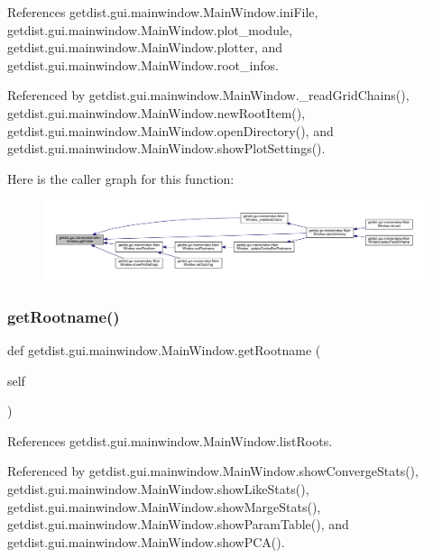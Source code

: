 References getdist.\+gui.\+mainwindow.\+Main\+Window.\+ini\+File, getdist.\+gui.\+mainwindow.\+Main\+Window.\+plot\+\_\+module, getdist.\+gui.\+mainwindow.\+Main\+Window.\+plotter, and getdist.\+gui.\+mainwindow.\+Main\+Window.\+root\+\_\+infos.



Referenced by getdist.\+gui.\+mainwindow.\+Main\+Window.\+\_\+read\+Grid\+Chains(), getdist.\+gui.\+mainwindow.\+Main\+Window.\+new\+Root\+Item(), getdist.\+gui.\+mainwindow.\+Main\+Window.\+open\+Directory(), and getdist.\+gui.\+mainwindow.\+Main\+Window.\+show\+Plot\+Settings().

Here is the caller graph for this function\+:
\nopagebreak
\begin{figure}[H]
\begin{center}
\leavevmode
\includegraphics[width=350pt]{classgetdist_1_1gui_1_1mainwindow_1_1MainWindow_a385cc81f23347ee51f9ee4454a676074_icgraph}
\end{center}
\end{figure}
\mbox{\label{classgetdist_1_1gui_1_1mainwindow_1_1MainWindow_addbd3bf89b07a5176f3daad52ada42c9}} 
\subsubsection{\texorpdfstring{get\+Rootname()}{getRootname()}}
{\footnotesize\ttfamily def getdist.\+gui.\+mainwindow.\+Main\+Window.\+get\+Rootname (\begin{DoxyParamCaption}\item[{}]{self }\end{DoxyParamCaption})}



References getdist.\+gui.\+mainwindow.\+Main\+Window.\+list\+Roots.



Referenced by getdist.\+gui.\+mainwindow.\+Main\+Window.\+show\+Converge\+Stats(), getdist.\+gui.\+mainwindow.\+Main\+Window.\+show\+Like\+Stats(), getdist.\+gui.\+mainwindow.\+Main\+Window.\+show\+Marge\+Stats(), getdist.\+gui.\+mainwindow.\+Main\+Window.\+show\+Param\+Table(), and getdist.\+gui.\+mainwindow.\+Main\+Window.\+show\+P\+C\+A().

